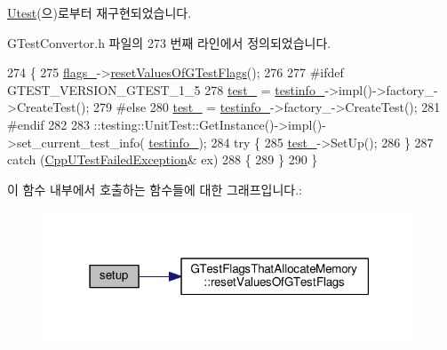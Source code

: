 \hyperlink{class_utest_a4fc01d736fe50cf5b977f755b675f11d}{Utest}(으)로부터 재구현되었습니다.



G\+Test\+Convertor.\+h 파일의 273 번째 라인에서 정의되었습니다.


\begin{DoxyCode}
274     \{
275         \hyperlink{class_g_test_u_test_a48e440860c5f66ccb4e4ccd975cfa96a}{flags\_}->\hyperlink{class_g_test_flags_that_allocate_memory_a28fb001d0514639d761942697dbf0ff9}{resetValuesOfGTestFlags}();
276 
277 \textcolor{preprocessor}{        #ifdef GTEST\_VERSION\_GTEST\_1\_5}
278         \hyperlink{class_g_test_u_test_a340ce8083add9c68ded290a1acd6468f}{test\_} = \hyperlink{class_g_test_u_test_abef922afbd1c3ecb7ad7e9c886f80ec0}{testinfo\_}->impl()->factory\_->CreateTest();
279 \textcolor{preprocessor}{    #else}
280         \hyperlink{class_g_test_u_test_a340ce8083add9c68ded290a1acd6468f}{test\_} = \hyperlink{class_g_test_u_test_abef922afbd1c3ecb7ad7e9c886f80ec0}{testinfo\_}->factory\_->CreateTest();
281 \textcolor{preprocessor}{    #endif}
282 
283         ::testing::UnitTest::GetInstance()->impl()->set\_current\_test\_info(
      \hyperlink{class_g_test_u_test_abef922afbd1c3ecb7ad7e9c886f80ec0}{testinfo\_});
284         \textcolor{keywordflow}{try} \{
285             \hyperlink{class_g_test_u_test_a340ce8083add9c68ded290a1acd6468f}{test\_}->SetUp();
286         \}
287         \textcolor{keywordflow}{catch} (\hyperlink{class_cpp_u_test_failed_exception}{CppUTestFailedException}& ex)
288         \{
289         \}
290     \}
\end{DoxyCode}


이 함수 내부에서 호출하는 함수들에 대한 그래프입니다.\+:
\nopagebreak
\begin{figure}[H]
\begin{center}
\leavevmode
\includegraphics[width=315pt]{class_g_test_u_test_a4fc01d736fe50cf5b977f755b675f11d_cgraph}
\end{center}
\end{figure}


